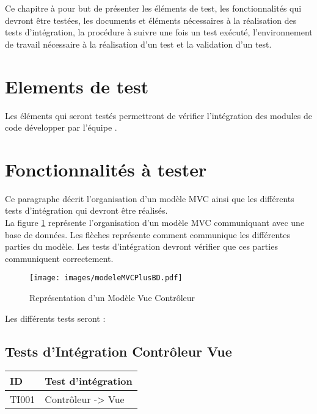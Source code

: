   
  Ce chapitre à pour but de présenter les éléments de test, les fonctionnalités qui devront être testées, les documents et éléments nécessaires à la réalisation des tests d'intégration, la procédure à suivre une fois un test exécuté, l'environnement de travail nécessaire à la réalisation d'un test et la validation d'un test. 
 
 
 \section{Elements de test}
 	Les éléments qui seront testés permettront de vérifier l'intégration des modules de code développer par l'équipe \nomEquipe.
 	
 \section{Fonctionnalités à tester}
	Ce paragraphe décrit l'organisation d'un modèle MVC ainsi que les différents tests d'intégration qui devront être réalisés. \\ 	
 	
 	La figure \ref{modeleMVC} représente l'organisation d'un modèle MVC communiquant avec une base de données. Les flèches représente comment communique les différentes parties du modèle. Les tests d'intégration devront vérifier que ces parties communiquent correctement.
 	
 	\begin{figure}[H]
 		\centering
 		\texttt{[image: images/modeleMVCPlusBD.pdf]}
 		\caption{Représentation d'un Modèle Vue Contrôleur}
 		\label{modeleMVC}
 	\end{figure}
 	
 Les différents tests seront :\\
 
 \subsection*{Tests d'Intégration Contrôleur Vue}
  \begin{center}
    \begin{tabular}[h]{|p{}|p{}|}
		\hline
		ID & Test d'intégration \\\hline
        TI001 & Contrôleur -> Vue \\\hline
     \end{tabular}
  \end{center}
  
